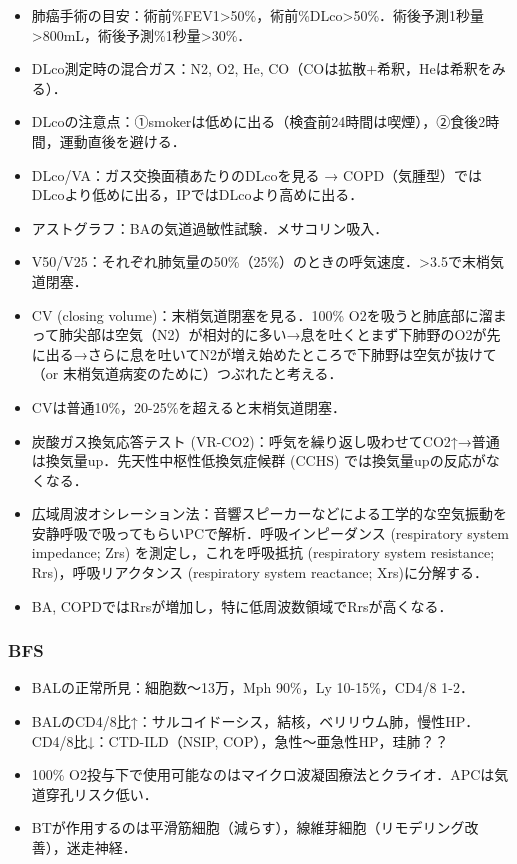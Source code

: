 \begin{itemize}
\item 肺癌手術の目安：術前\%FEV1>50\%，術前\%DLco>50\%．術後予測1秒量>800mL，術後予測\%1秒量>30\%．
\item DLco測定時の混合ガス：N2, O2, He, CO（COは拡散+希釈，Heは希釈をみる）．
\item DLcoの注意点：①smokerは低めに出る（検査前24時間は喫煙），②食後2時間，運動直後を避ける．
\item DLco/VA：ガス交換面積あたりのDLcoを見る → COPD（気腫型）ではDLcoより低めに出る，IPではDLcoより高めに出る．
\item アストグラフ：BAの気道過敏性試験．メサコリン吸入．
\item V50/V25：それぞれ肺気量の50\%（25\%）のときの呼気速度．>3.5で末梢気道閉塞．
\item CV (closing volume)：末梢気道閉塞を見る．100\% O2を吸うと肺底部に溜まって肺尖部は空気（N2）が相対的に多い→息を吐くとまず下肺野のO2が先に出る→さらに息を吐いてN2が増え始めたところで下肺野は空気が抜けて（or 末梢気道病変のために）つぶれたと考える．\item CVは普通10\%，20-25\%を超えると末梢気道閉塞．
\item 炭酸ガス換気応答テスト (VR-CO2)：呼気を繰り返し吸わせてCO2↑→普通は換気量up．先天性中枢性低換気症候群 (CCHS) では換気量upの反応がなくなる．
\item 広域周波オシレーション法：音響スピーカーなどによる工学的な空気振動を安静呼吸で吸ってもらいPCで解析．呼吸インピーダンス (respiratory system impedance; Zrs) を測定し，これを呼吸抵抗 (respiratory system resistance; Rrs)，呼吸リアクタンス (respiratory system reactance; Xrs)に分解する．
\item BA, COPDではRrsが増加し，特に低周波数領域でRrsが高くなる．
\end{itemize}


\subsubsection{BFS}

\begin{itemize}
\item BALの正常所見：細胞数〜13万，Mph 90\%，Ly 10-15\%，CD4/8 1-2．
\item BALのCD4/8比↑：サルコイドーシス，結核，ベリリウム肺，慢性HP．CD4/8比↓：CTD-ILD（NSIP, COP），急性〜亜急性HP，珪肺？？
\item 100\% O2投与下で使用可能なのはマイクロ波凝固療法とクライオ．APCは気道穿孔リスク低い．
\item BTが作用するのは平滑筋細胞（減らす），線維芽細胞（リモデリング改善），迷走神経．
\end{itemize}


